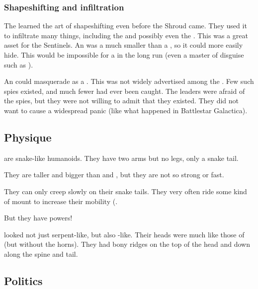 \subsubsection{Shapeshifting and infiltration}
The \ophidians learned the art of shapeshifting even before the Shroud came. 
They used it to infiltrate many things, including the \aryothim and possibly even the \resphain. 
This was a great asset for the Sentinels. 
An \ophidian was a much smaller \vertex than a \dragon, so it could more easily hide.
This would be impossible for a \dragon in the long run (even a master of disguise such as \Nzessuacrith). 

An \ophidian could masquerade as a \bezed. 
This was not widely advertised among the \resphain.
Few such spies existed, and much fewer had ever been caught. 
The \resphan leaders were afraid of the spies, but they were not willing to admit that they existed.
They did not want to cause a widespread panic (like what happened in Battlestar Galactica).









\subsection{Physique}
\Ophidians{} are snake-like humanoids. 
They have two arms but no legs, only a snake tail. 

They are taller and bigger than \humans{} and \scathae, but they are not so strong or fast. 

They can only creep slowly on their snake tails. 
They very often ride some kind of mount to increase their mobility (. 

But they have  powers! 

\Ophidians looked not just serpent-like, but also \dragon-like. 
Their heads were much like those of \dragons (but without the horns). 
They had bony ridges on the top of the head and down along the spine and tail. 








\subsection{Politics}





